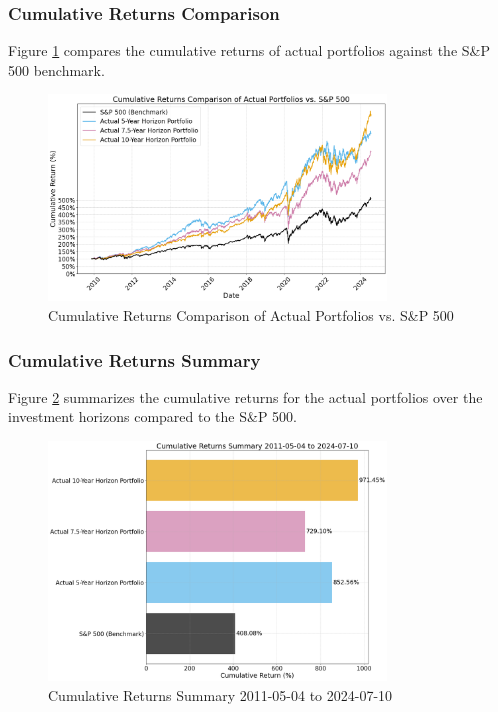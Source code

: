 \subsubsection{Cumulative Returns Comparison}
Figure \ref{fig:cumulative_returns_comparison} compares the cumulative returns of actual portfolios against the S\&P 500 benchmark.

\begin{figure}[!htbp]
    \centering
    \includegraphics[width=0.8\textwidth]{../Figures/cumulative_returns_comparison.png}
    \caption{Cumulative Returns Comparison of Actual Portfolios vs. S\&P 500}
    \label{fig:cumulative_returns_comparison}
\end{figure}

\subsubsection{Cumulative Returns Summary}
Figure \ref{fig:cumulative_returns_summary} summarizes the cumulative returns for the actual portfolios over the investment horizons compared to the S\&P 500.

\begin{figure}[!htbp]
    \centering
    \includegraphics[width=0.8\textwidth]{../Figures/cumulative_returns_summary.png}
    \caption{Cumulative Returns Summary 2011-05-04 to 2024-07-10}
    \label{fig:cumulative_returns_summary}
\end{figure}

